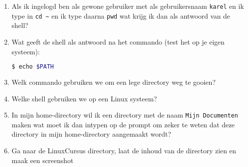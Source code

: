 
\begin{enumerate}
\item Als ik ingelogd ben als gewone gebruiker met als gebruikersnaam \texttt{karel} en ik type in \texttt{cd \~{}} en ik type daarna \texttt{pwd} wat krijg ik dan als antwoord van de shell?

\item Wat geeft de shell als antwoord na het commando (test het op je eigen systeem):
\begin{lstlisting}[language=bash]
$ echo $PATH
\end{lstlisting}

\item Welk commando gebruiken we om een lege directory weg te gooien?

\item Welke shell gebruiken we op een Linux systeem?

\item In mijn home-directory wil ik een directory met de naam \texttt{Mijn Documenten} maken wat moet ik dan intypen op de prompt om zeker te weten dat deze directory in mijn home-directory aangemaakt wordt?

\item Ga naar de LinuxCursus directory, laat de inhoud van de directory zien en maak een screenshot

\end{enumerate}

